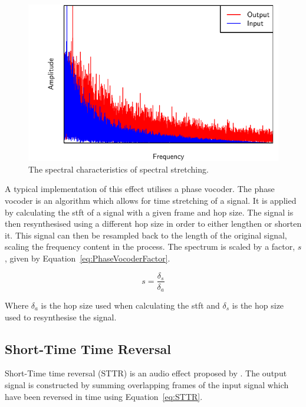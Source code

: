 		\begin{figure}[h!]
			\centering
			\includegraphics{chapter3/Images/SpectralStretchingSpectrum.pdf}
			\caption{The spectral characteristics of spectral stretching.}
			\label{fig:SpectralStretching}
		\end{figure}

		A typical implementation of this effect utilises a phase vocoder. The phase vocoder is an algorithm which
		allows for time stretching of a signal. It is applied by calculating the \acrfull{stft} of a signal with a
		given frame and hop size. The signal is then resynthesised using a different hop size in order to either
		lengthen or shorten it. This signal can then be resampled back to the length of the original signal,
		scaling the frequency content in the process. The spectrum is scaled by a factor, $s$, given by
		Equation~\ref{eq:PhaseVocoderFactor}.

		\begin{equation}
			s = \frac{\delta_{s}}{\delta_{a}}
			\label{eq:PhaseVocoderFactor}
		\end{equation}

		Where $\delta_{a}$ is the hop size used when calculating the \acrshort{stft} and $\delta_{s}$ is the hop
		size used to resynthesise the signal.

	\subsection{Short-Time Time Reversal}
	\label{sec:Excitation-Methods-STTR}
		Short-Time time reversal (STTR) is an audio effect proposed by \citet{kim2014shorttime}. The output signal
		is constructed by summing overlapping frames of the input signal which have been reversed in time using
		Equation~\ref{eq:STTR}.

